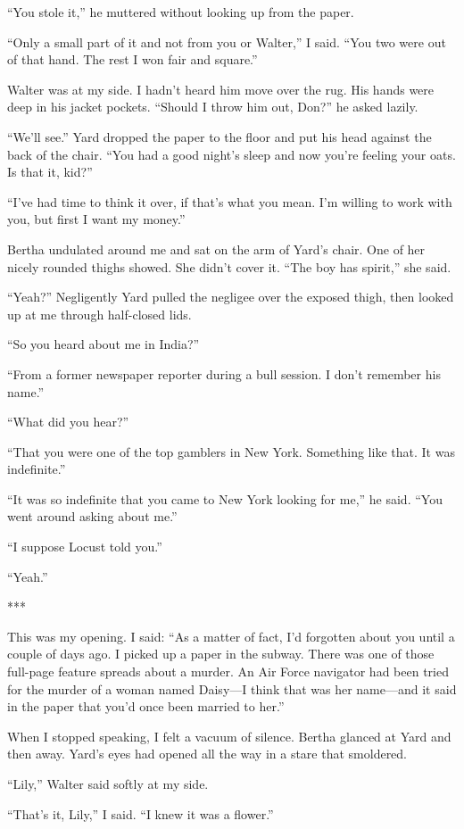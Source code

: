 {“You stole it,” he muttered without looking up from the paper.

“Only a small part of it and not from you or Walter,” I said. “You two were out of that hand. The rest I won fair and square.”

Walter was at my side. I hadn’t heard him move over the rug. His hands were deep in his jacket pockets. “Should I throw him out, Don?” he asked lazily.

“We’ll see.” Yard dropped the paper to the floor and put his head against the back of the chair. “You had a good night’s sleep and now you’re feeling your oats. Is that it, kid?”

“I’ve had time to think it over, if that’s what you mean. I’m willing to work with you, but first I want my money.”

Bertha undulated around me and sat on the arm of Yard’s chair. One of her nicely rounded thighs showed. She didn’t cover it. “The boy has spirit,” she said.

“Yeah?” Negligently Yard pulled the negligee over the exposed thigh, then looked up at me through half-closed lids.

“So you heard about me in India?”

“From a former newspaper reporter during a bull session. I don’t remember his name.”

“What did you hear?”

“That you were one of the top gamblers in New York. Something like that. It was indefinite.”

“It was so indefinite that you came to New York looking for me,” he said. “You went around asking about me.”

“I suppose Locust told you.”

“Yeah.”

***

This was my opening. I said: “As a matter of fact, I’d forgotten about you until a couple of days ago. I picked up a paper in the subway. There was one of those full-page feature spreads about a murder. An Air Force navigator had been tried for the murder of a woman named Daisy—I think that was her name—and it said in the paper that you’d once been married to her.”

When I stopped speaking, I felt a vacuum of silence. Bertha glanced at Yard and then away. Yard’s eyes had opened all the way in a stare that smoldered.

“Lily,” Walter said softly at my side.

“That’s it, Lily,” I said. “I knew it was a flower.”

}
